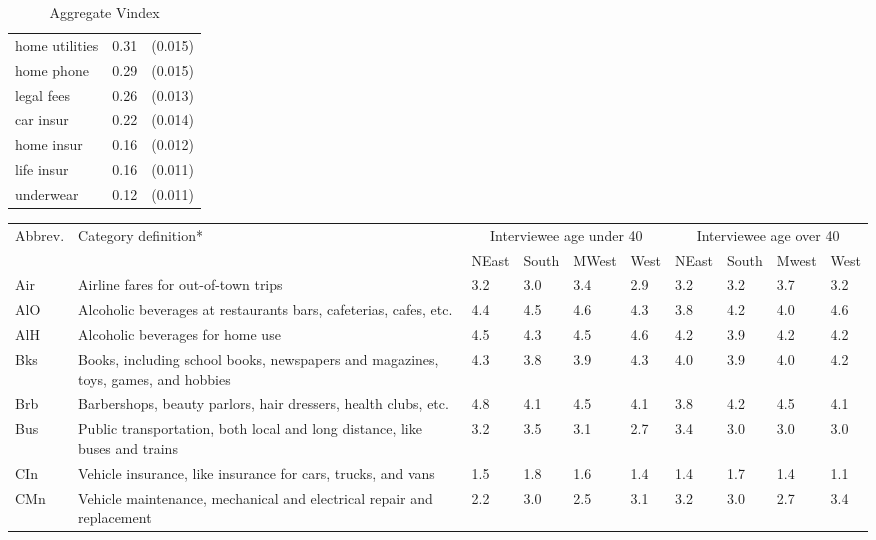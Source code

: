 \documentclass[11pt]{article}
\begin{document}
\begin{CJK}{UTF8}{gbsn}
\begin{table}[!ht]
\begin{tabular}{lcc}
home utilities   & 0.31 & (0.015) \\
home phone       & 0.29 & (0.015) \\
legal fees       & 0.26 & (0.013) \\
car insur        & 0.22 & (0.014) \\
home insur       & 0.16 & (0.012) \\
life insur       & 0.16 & (0.011) \\
underwear        & 0.12 & (0.011) \\
\hline
\end{tabular}
\caption{Aggregate Vindex}
\label{tab:vintab}
\vspace{-2in}
\end{table}

\begin{table}[!ht]
    \centering
    {\footnotesize
        \begin{tabular}{lp{40mm}llllllll}
        \hline\hline
        {\tiny Abbrev.}&{\tiny Category definition*} & \multicolumn{4}{c}{Interviewee age under 40} & \multicolumn{4}{c}{Interviewee age over 40}\\
            & & NEast & South & MWest & West  & NEast & South & Mwest & West \\
        \hline
        Air & {\tiny  Airline fares for out-of-town trips}& 3.2 & 3.0 & 3.4 & 2.9 & 3.2 & 3.2 & 3.7 & 3.2\\
        AlO & {\tiny  Alcoholic beverages at restaurants bars, cafeterias, cafes, etc.}& 4.4 & 4.5 & 4.6 & 4.3 & 3.8 & 4.2 & 4.0 & 4.6\\
        AlH & {\tiny  Alcoholic beverages for home use}& 4.5 & 4.3 & 4.5 & 4.6 & 4.2 & 3.9 & 4.2 & 4.2\\
        Bks & {\tiny  Books, including school books, newspapers and magazines, toys, games, and hobbies}& 4.3 & 3.8 & 3.9 & 4.3 & 4.0 & 3.9 & 4.0 & 4.2\\
        Brb & {\tiny  Barbershops, beauty parlors, hair dressers, health clubs, etc.}& 4.8 & 4.1 & 4.5 & 4.1 & 3.8 & 4.2 & 4.5 & 4.1\\
        Bus & {\tiny  Public transportation, both local and long distance, like buses and trains}& 3.2 & 3.5 & 3.1 & 2.7 & 3.4 & 3.0 & 3.0 & 3.0\\
        CIn & {\tiny  Vehicle insurance, like insurance for cars, trucks, and vans}& 1.5 & 1.8 & 1.6 & 1.4 & 1.4 & 1.7 & 1.4 & 1.1\\
        CMn & {\tiny  Vehicle maintenance, mechanical and electrical repair and replacement}& 2.2 & 3.0 & 2.5 & 3.1 & 3.2 & 3.0 & 2.7 & 3.4\\

\end{tabular}}
\end{table}
\end{CJK}
\end{document}
